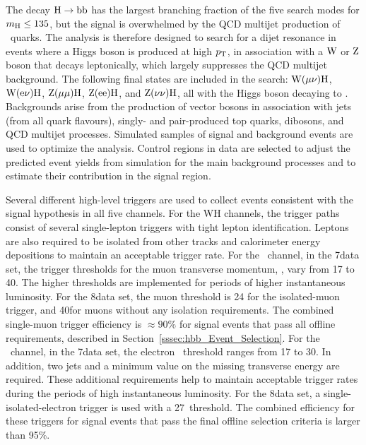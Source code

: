 \documentclass[11pt,twoside,a4paper,cmspaper,final,collab]{cms-tdr}
\begin{document}
The decay $\mathrm{H}\to\mathrm{b}\mathrm{b}$ has the
largest branching fraction of the five search modes for $m_{\mathrm{H}}\leq135$\GeV, but the
signal is overwhelmed by the QCD multijet production of \cPqb\ quarks.  The analysis
is therefore designed to search for a dijet resonance in events
where a Higgs boson is produced at high $p_{\mathrm{T}}$, in association
with a $\mathrm{W}$ or $\mathrm{Z}$ boson that decays leptonically, which largely suppresses the QCD
multijet background.
The following final states are
included in the search:
$\mathrm{W}(\mu\nu)\mathrm{H}$, $\mathrm{W}(\mathrm{e}\nu)\mathrm{H}$, $\mathrm{Z}(\mu\mu)\mathrm{H}$,
$\mathrm{Z}(\mathrm{e}\mathrm{e})\mathrm{H}$, and $\mathrm{Z}(\nu\nu)\mathrm{H}$, all with the Higgs
boson decaying to \cPqb\cPqb. Backgrounds arise from the production of vector bosons in association with
jets (from all quark flavours), singly- and pair-produced top quarks, dibosons, and
QCD multijet processes.
Simulated samples of signal and background events are used to
optimize the analysis. Control regions in data
are selected to adjust the predicted event yields from simulation for the main
background processes  and to estimate their contribution in the signal
region.




Several different high-level triggers are used to collect events consistent with
the signal hypothesis in all five channels. For the WH channels, the trigger paths consist of several single-lepton
triggers with tight lepton identification. Leptons are also required
to be isolated from other tracks and calorimeter energy depositions to maintain an acceptable trigger
rate. For the \WmnH\ channel, in the 7\TeV data set, the trigger
thresholds for the muon transverse
 momentum, \PT, vary from  17 to 40\GeV. The higher
thresholds are implemented  for periods of higher instantaneous
luminosity. For the 8\TeV  data set, the muon \PT threshold is 24\GeV
for the isolated-muon trigger, and 40\GeV for muons without any isolation requirements.
The combined single-muon trigger efficiency is $\approx$$90\%$ for
signal events that pass all offline requirements, described
in Section~\ref{sssec:hbb_Event_Selection}.
For the \WenH\ channel, in the 7\TeV data set,  the electron \PT\
threshold ranges from 17 to 30\GeV. In addition, two jets and a minimum
value on the missing transverse energy are required.
These additional requirements
help to maintain acceptable trigger
rates during the periods of high instantaneous luminosity. For the
8\TeV data set, a single-isolated-electron trigger is used with
a 27\GeV \PT\ threshold.
The combined efficiency for these triggers for signal events that
pass the final offline selection criteria is larger than 95\%.
\end{document}
